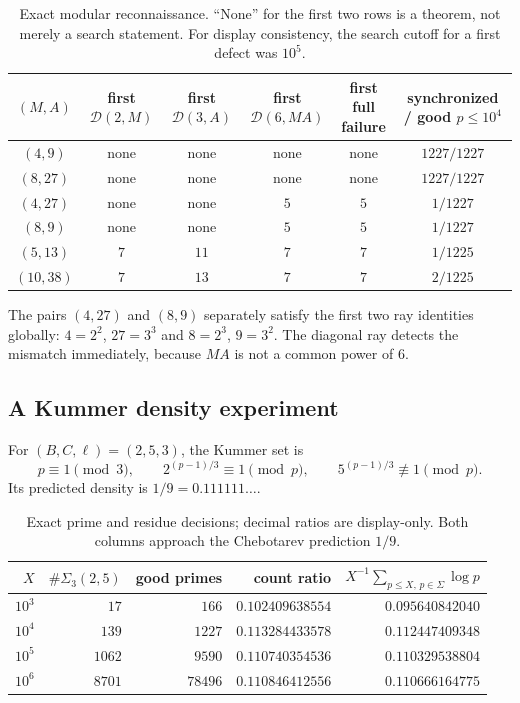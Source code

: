 \documentclass[11pt]{article}
\theoremstyle{definition}
\newcommand{\Def}{\mathcal D}
\begin{document}
\begin{table}[ht]
\centering
\scriptsize
\setlength{\tabcolsep}{3.4pt}
\begin{tabular}{@{}cccccc@{}}
\toprule
$(M,A)$
& \shortstack{first\\$\Def(2,M)$}
& \shortstack{first\\$\Def(3,A)$}
& \shortstack{first\\$\Def(6,MA)$}
& \shortstack{first full\\failure}
& \shortstack{synchronized / good\\$p\le10^4$} \\
\midrule
$(4,9)$   & none & none & none & none & $1227/1227$ \\
$(8,27)$  & none & none & none & none & $1227/1227$ \\
$(4,27)$  & none & none & $5$ & $5$ & $1/1227$ \\
$(8,9)$   & none & none & $5$ & $5$ & $1/1227$ \\
$(5,13)$  & $7$ & $11$ & $7$ & $7$ & $1/1225$ \\
$(10,38)$ & $7$ & $13$ & $7$ & $7$ & $2/1225$ \\
\bottomrule
\end{tabular}
\caption{Exact modular reconnaissance.  ``None'' for the first two rows is a theorem, not
merely a search statement.  For display consistency, the search cutoff for a first defect was
$10^5$.}
\end{table}

The pairs $(4,27)$ and $(8,9)$ separately satisfy the first two ray identities globally:
$4=2^2$, $27=3^3$ and $8=2^3$, $9=3^2$.  The diagonal ray detects the mismatch immediately,
because $MA$ is not a common power of $6$.

\subsection{A Kummer density experiment}

For $(B,C,\ell)=(2,5,3)$, the Kummer set is
\[
 p\equiv1\pmod3,
 \qquad 2^{(p-1)/3}\equiv1\pmod p,
 \qquad 5^{(p-1)/3}\not\equiv1\pmod p.
\]
Its predicted density is $1/9=0.111111\ldots$.

\begin{table}[ht]
\centering
\small
\begin{tabular}{rrrrr}
\toprule
$X$ & $\#\Sigma_3(2,5)$ & good primes & count ratio &
$X^{-1}\sum_{p\le X,\,p\in\Sigma}\log p$ \\
\midrule
$10^3$ & $17$ & $166$ & $0.102409638554$ & $0.095640842040$ \\
$10^4$ & $139$ & $1227$ & $0.113284433578$ & $0.112447409348$ \\
$10^5$ & $1062$ & $9590$ & $0.110740354536$ & $0.110329538804$ \\
$10^6$ & $8701$ & $78496$ & $0.110846412556$ & $0.110666164775$ \\
\bottomrule
\end{tabular}
\caption{Exact prime and residue decisions; decimal ratios are display-only.  Both columns
approach the Chebotarev prediction $1/9$.}
\end{table}
\end{document}
